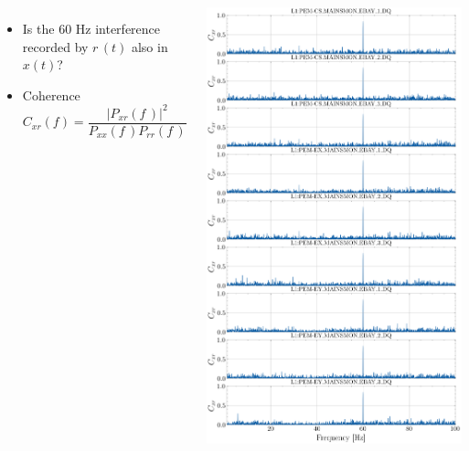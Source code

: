 \documentclass[10pt]{beamer}
\begin{document}
\begin{frame}
	
	
	
	\begin{columns}
		
		\begin{itemize}
			\item Is the 60 Hz interference recorded by $r\,(t)$ also in $x(t)$?
			\item Coherence
			\begin{equation}
				C_{xr}(f)	= \frac{|P_{xr}(f\,)|^2}{P_{xx}(f\,) P_{rr}(f\,)}  \label{eq:coherence} \nonumber
			\end{equation}

		\end{itemize}
		
	
		\vspace*{-5mm}
		\includegraphics[width=0.82\columnwidth,height=1.5\columnwidth]{images/stacked_coherence_plot_new}
	\end{columns}		
	
\end{frame}
\end{document}

